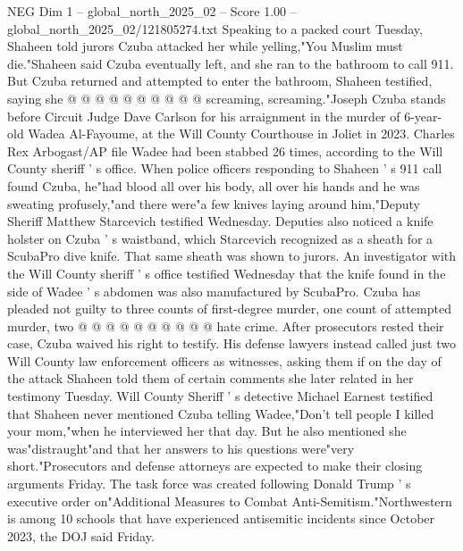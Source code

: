 \begin{textsample}{NEG Dim 1 – global\_north\_2025\_02 – Score 1.00 – global\_north\_2025\_02/121805274.txt}
Speaking to a packed court Tuesday, Shaheen told jurors Czuba attacked her while yelling,"You Muslim must die."Shaheen said Czuba eventually left, and she ran to the bathroom to call 911.
But Czuba returned and attempted to enter the bathroom, Shaheen testified, saying she @ @ @ @ @ @ @ @ @ @ screaming, screaming."Joseph Czuba stands before Circuit Judge Dave Carlson for his arraignment in the murder of 6-year-old Wadea Al-Fayoume, at the Will County Courthouse in Joliet in 2023.
Charles Rex Arbogast/AP file Wadee had been stabbed 26 times, according to the Will County sheriff ' s office.
When police officers responding to Shaheen ' s 911 call found Czuba, he"had blood all over his body, all over his hands and he was sweating profusely,"and there were"a few knives laying around him,"Deputy Sheriff Matthew Starcevich testified Wednesday.
Deputies also noticed a knife holster on Czuba ' s waistband, which Starcevich recognized as a sheath for a ScubaPro dive knife.
That same sheath was shown to jurors.
An investigator with the Will County sheriff ' s office testified Wednesday that the knife found in the side of Wadee ' s abdomen was also manufactured by ScubaPro.
Czuba has pleaded not guilty to three counts of first-degree murder, one count of attempted murder, two @ @ @ @ @ @ @ @ @ @ hate crime.
After prosecutors rested their case, Czuba waived his right to testify.
His defense lawyers instead called just two Will County law enforcement officers as witnesses, asking them if on the day of the attack Shaheen told them of certain comments she later related in her testimony Tuesday.
Will County Sheriff ' s detective Michael Earnest testified that Shaheen never mentioned Czuba telling Wadee,"Don't tell people I killed your mom,"when he interviewed her that day.
But he also mentioned she was"distraught"and that her answers to his questions were"very short."Prosecutors and defense attorneys are expected to make their closing arguments Friday.
The task force was created following Donald Trump ' s executive order on"Additional Measures to Combat Anti-Semitism."Northwestern is among 10 schools that have experienced antisemitic incidents since October 2023, the DOJ said Friday.

\end{textsample}
